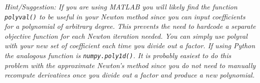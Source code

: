 \documentclass{article}
\begin{document}
\begin{enumerate}
\begin{itemize}
    \emph{Hint/Suggestion:  If you are using MATLAB you will likely find the function \texttt{polyval()} to be useful in your Newton method since you can input coefficients for a polynomial of arbitrary degree.  This prevents the need to hardcode a separate objective function for each Newton iteration needed.  You can simply use \emph{polyval} with your new set of coefficient each time you divide out a factor.  If using Python the analogous function is \texttt{numpy.poly1d()}.  It is probably easiest to do this problem with the approximate Newton's method since you do not need to manually recompute derivatives once you divide out a factor and produce a new polynomial. }
  \end{itemize}
    
\end{enumerate}
\end{document}
